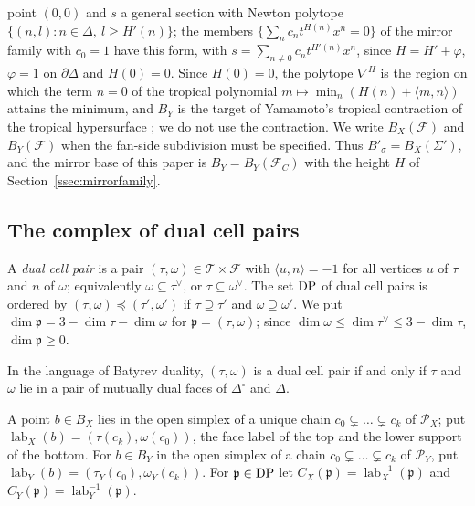 point $(0,0)$ and $s$ a general section with Newton polytope $\{(n,l):n\in\Delta,\ l\ge H'(n)\}$; the members
$\{\sum_nc_nt^{H(n)}x^n=0\}$ of the mirror family with $c_0=1$ have this form, with $s=\sum_{n\ne0}c_nt^{H'(n)}x^n$, since
$H=H'+\varphi$, $\varphi=1$ on $\partial\Delta$ and $H(0)=0$. Since $H(0)=0$, the
polytope $\nabla^H$ is the region on which the term $n=0$ of the tropical polynomial $m\mapsto\min_n(H(n)+\langle
m,n\rangle)$ attains the minimum, and $B_Y$ is the target of Yamamoto's tropical contraction of the tropical
hypersurface \cite[Thm.~1.2(2), (5.36), Prop.~5.4]{Ya21}; we do not use the contraction. We write $B_X(\mathcal F)$ and
$B_Y(\mathcal F)$ when the fan-side subdivision must be specified. Thus $B'_\sigma=B_X(\Sigma')$, and the mirror base of this paper is
$B_Y=B_Y(\mathcal F_C)$ with the height $H$ of Section~\ref{ssec:mirrorfamily}.

\subsection{The complex of dual cell pairs}\label{ssec:leg-mixed}
\begin{definition}\label{def:DP}
A \emph{dual cell pair} is a pair $(\tau,\omega)\in\mathcal T\times\mathcal F$ with $\langle u,n\rangle=-1$ for all vertices $u$
of $\tau$ and $n$ of $\omega$; equivalently $\omega\subseteq\tau^\vee$, or $\tau\subseteq\omega^\vee$. The set $\mathrm{DP}$ of
dual cell pairs is ordered by $(\tau,\omega)\preceq(\tau',\omega')$ if $\tau\supseteq\tau'$ and $\omega\supseteq\omega'$. We
put $\dim{\mathfrak p}=3-\dim\tau-\dim\omega$ for ${\mathfrak p}=(\tau,\omega)$; since $\dim\omega\le\dim\tau^\vee\le3-\dim\tau$, $\dim{\mathfrak p}\ge0$.
\end{definition}
In the language of Batyrev duality, $(\tau,\omega)$ is a dual cell pair if and only if $\tau$ and $\omega$ lie in a pair of
mutually dual faces of $\Delta^\circ$ and $\Delta$.

\begin{definition}[labels]\label{def:strata}
A point $b\in B_X$ lies in the open simplex of a unique chain $c_0\subsetneq\dots\subsetneq c_k$ of $\mathscr P_X$; put
$\operatorname{lab}_X(b)=(\tau(c_k),\omega(c_0))$, the face label of the top and the lower support of the bottom. For $b\in B_Y$ in
the open simplex of a chain $c_0\subsetneq\dots\subsetneq c_k$ of $\mathscr P_Y$, put
$\operatorname{lab}_Y(b)=(\tau_Y(c_0),\omega_Y(c_k))$. For ${\mathfrak p}\in\mathrm{DP}$ let $C_X({\mathfrak p})=\operatorname{lab}_X^{-1}({\mathfrak p})$ and $C_Y({\mathfrak p})=\operatorname{lab}_Y^{-1}({\mathfrak p})$.
\end{definition}

